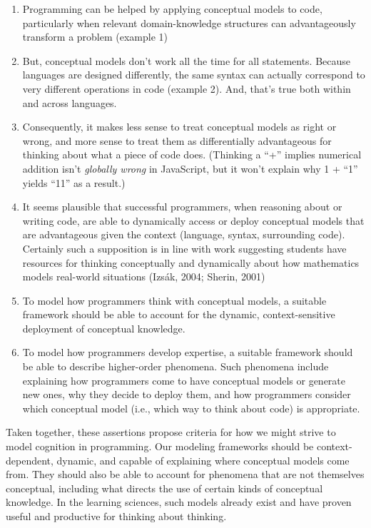 \begin{enumerate}
\def\labelenumi{\arabic{enumi}.}
\item
  Programming can be helped by applying conceptual models to code,
  particularly when relevant domain-knowledge structures can
  advantageously transform a problem (example 1)
\item
  But, conceptual models don't work all the time for all statements.
  Because languages are designed differently, the same syntax can
  actually correspond to very different operations in code (example 2).
  And, that's true both within and across languages.
\item
  Consequently, it makes less sense to treat conceptual models as right
  or wrong, and more sense to treat them as differentially advantageous
  for thinking about what a piece of code does. (Thinking a ``+''
  implies numerical addition isn't \emph{globally wrong} in JavaScript,
  but it won't explain why 1 + ``1'' yields ``11'' as a result.)
\item
  It seems plausible that successful programmers, when reasoning about
  or writing code, are able to dynamically access or deploy conceptual
  models that are advantageous given the context (language, syntax,
  surrounding code). Certainly such a supposition is in line with work
  suggesting students have resources for thinking conceptually and
  dynamically about how mathematics models real-world situations (Izsák,
  2004; Sherin, 2001)
\item
  To model how programmers think with conceptual models, a suitable
  framework should be able to account for the dynamic, context-sensitive
  deployment of conceptual knowledge.
\item
  To model how programmers develop expertise, a suitable framework
  should be able to describe higher-order phenomena. Such phenomena
  include explaining how programmers come to have conceptual models or
  generate new ones, why they decide to deploy them, and how programmers
  consider which conceptual model (i.e., which way to think about code)
  is appropriate.
\end{enumerate}

Taken together, these assertions propose criteria for how we might
strive to model cognition in programming. Our modeling frameworks should
be context-dependent, dynamic, and capable of explaining where
conceptual models come from. They should also be able to account for
phenomena that are not themselves conceptual, including what directs the
use of certain kinds of conceptual knowledge. In the learning sciences,
such models already exist and have proven useful and productive for
thinking about thinking.

